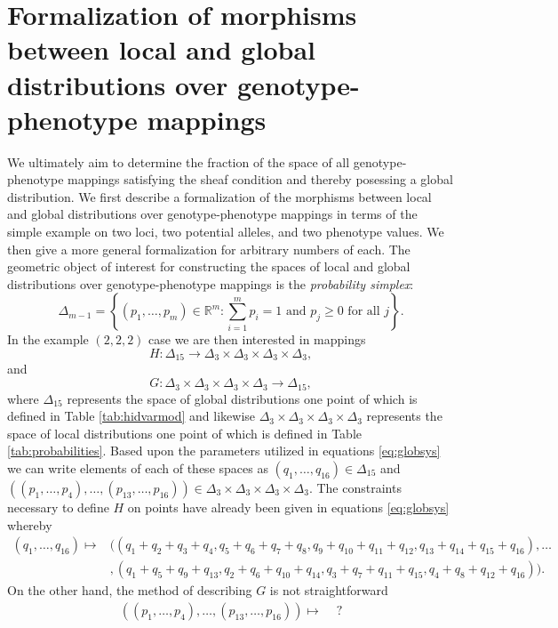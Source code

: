 \documentclass[10pt]{article}
\begin{document}
\section*{Formalization of morphisms between local and global distributions over genotype-phenotype mappings}
We ultimately aim to determine the fraction of the space of all genotype-phenotype mappings satisfying the sheaf condition and thereby posessing a global distribution. We first describe a formalization of the morphisms between local and global distributions over genotype-phenotype mappings in terms of the simple example on two loci, two potential alleles, and two phenotype values. We then give a more general formalization for arbitrary numbers of each. The geometric object of interest for constructing the spaces of local and global distributions over genotype-phenotype mappings is the \emph{probability simplex}:
$$
\Delta_{m-1} = \left\{ (p_1, \ldots , p_m) \in \mathbb{R}^m \colon \sum_{i=1}^m p_i = 1 \text{ and } p_j \geq 0 \text{ for all } j \right\}.
$$
In the example $(2,2,2)$ case we are then interested in mappings
$$
H \colon \Delta_{15} \longrightarrow \Delta_3 \times \Delta_3 \times \Delta_3 \times \Delta_3,
$$
and
$$
G \colon	 \Delta_3 \times \Delta_3 \times \Delta_3 \times \Delta_3 \longrightarrow \Delta_{15},
$$
where $\Delta_{15}$ represents the space of global distributions one point of which is defined in Table \ref{tab:hidvarmod} and likewise $\Delta_3 \times \Delta_3 \times \Delta_3 \times \Delta_3$ represents the space of local distributions one point of which is defined in Table \ref{tab:probabilities}. Based upon the parameters utilized in equations \ref{eq:globsys} we can write elements of each of these spaces as $(q_1, \ldots, q_{16}) \in \Delta_{15}$ and $((p_1, \ldots , p_4), \ldots, (p_{13},\ldots,p_{16})) \in \Delta_3 \times \Delta_3 \times \Delta_3 \times \Delta_3$. The constraints necessary to define $H$ on points have already been given in equations \ref{eq:globsys} whereby
\begin{align*}
(q_1, \ldots , q_{16}) \mapsto &((q_1+q_2+q_3+q_4, q_5+q_6+q_7+q_8, q_9+q_{10}+q_{11}+q_{12},q_{13}+q_{14}+q_{15}+q_{16}), \ldots \\
&,(q_1 + q_5 + q_9 + q_{13}, q_2 + q_6 + q_{10} + q_{14}, q_3 + q_7 + q_{11} + q_{15}, q_4 + q_8 + q_{12} + q_{16} ) ).
\end{align*}
On the other hand, the method of describing $G$ is not straightforward
\begin{align*}
((p_1, \ldots , p_4), \ldots, (p_{13},\ldots,p_{16})) \mapsto & \,\,?
\end{align*}
\end{document}
